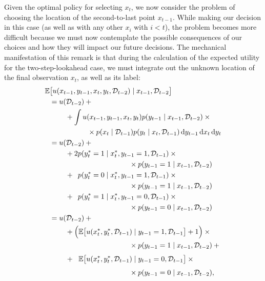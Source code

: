 \documentclass{acm_proc_article-sp}
\newcommand{\cm}[1]{\mathcal{#1}}
\newcommand{\data}{\cm{D}}
\newcommand{\given}{\mid}
\newcommand{\intd}[1]{\,\mathrm{d}#1}
\begin{document}
Given the optimal policy for selecting $x_t$, we now consider the
problem of choosing the location of the second-to-last point
$x_{t-1}$.  While making our decision in this case (as well as with
any other $x_i$ with $i < t$), the problem becomes more difficult
because we must now contemplate the possible consequences of our
choices and how they will impact our future decisions. The mechanical
manifestation of this remark is that during the calculation of the
expected utility for the two-step-lookahead case, we must integrate
out the unknown location of the final observation $x_t$, as well as
its label:
\begin{align}\label{twostep}
  \mathbb{E}\bigl[
    u(&x_{t-1}, y_{t-1}, x_t, y_t, \data_{t-2}) 
    \given x_{t-1}, \data_{t-2}
  \bigr]
  {}
  \nonumber
  \\
  &
  \mspace{-25mu}
  =
  u(\data_{t-2}) 
  + 
  {}
  \nonumber
  \\
  &
  \mspace{15mu}
  {}
  + 
  \int 
  u(x_{t-1}, y_{t-1}, x_t, y_t)
  p(y_{t-1} \given x_{t-1}, \data_{t-2})
  \times
  {}
  \nonumber
  \\
  &
  \mspace{70mu}
  {}
  \times
  p(x_t \given \data_{t-1})
  p(y_t \given x_t, \data_{t-1})
  \intd{y_{t-1}} 
  \intd{x_t} 
  \intd{y_t}
  \nonumber
  \\
  &
  \mspace{-25mu}
  =
  u(\data_{t-2})
  +
  {}
  \nonumber
  \\
  &
  \mspace{15mu}
  {}
  +
  2
  p(y_t^\ast = 1 \given x_t^\ast, y_{t-1} = 1, \data_{t-1})
  \times
  {}
  \nonumber
  \\
  &
  \mspace{175mu}
  {}
  \times
  p(y_{t-1} = 1 \given x_{t-1}, \data_{t-2})
  \nonumber
  \\
  &
  \mspace{15mu}
  {}
  +
  \phantom{2}
  p(y_t^\ast = 0 \given x_t^\ast, y_{t-1} = 1, \data_{t-1})
  \times
  {}
  \nonumber
  \\
  &
  \mspace{175mu}
  {}
  \times
  p(y_{t-1} = 1 \given x_{t-1}, \data_{t-2})
  \nonumber
  \\
  &
  \mspace{15mu}
  {}
  +
  \phantom{2}
  p(y_t^\ast = 1 \given x_t^\ast, y_{t-1} = 0, \data_{t-1})
  \times
  {}
  \nonumber
  \\
  &
  \mspace{175mu}
  {}
  \times
  p(y_{t-1} = 0 \given x_{t-1}, \data_{t-2})
  \nonumber
  \\
  &
  \mspace{-25mu}
  =
  u(\data_{t-2})
  +
  {}
  \nonumber
  \\
  &
  \mspace{15mu}
  {}
  +
  \Bigl(
    \mathbb{E}
    \bigl[
      u(x_t^\ast, y_t^\ast, \data_{t-1}) \given y_{t-1} = 1, \data_{t-1}
    \bigr] 
    + 1
  \Bigr)
  \times
  {}
  \nonumber
  \\
  &
  {}
  \mspace{175mu}
  \times
  p(y_{t-1} = 1 \given x_{t-1}, \data_{t-2})
  +
  {}
  \nonumber
  \\
  &
  \mspace{15mu}
  +
  \phantom{\Bigl(}
  \mathbb{E}
  \bigl[
    u(x_t^\ast, y_t^\ast, \data_{t-1}) \given y_{t-1} = 0, \data_{t-1} 
  \bigr]
  \times
  {}
  \nonumber
  \\
  &
  \mspace{175mu}
  {}
  \times
  p(y_{t-1} = 0 \given x_{t-1}, \data_{t-2}),
\end{align}
\end{document}
